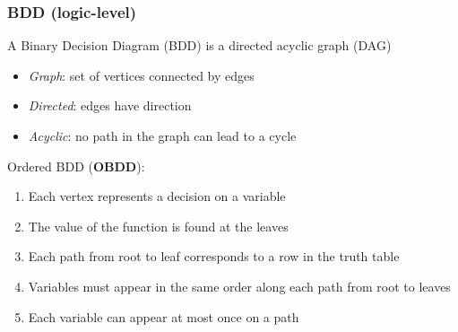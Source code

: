 \subsubsection{BDD (logic-level)}
A Binary Decision Diagram (BDD) is a directed acyclic graph (DAG)
\begin{itemize}
\item \textit{Graph}: set of vertices connected by edges
\item \textit{Directed}: edges have direction
\item \textit{Acyclic}: no path in the graph can lead to a cycle
\end{itemize}
Ordered BDD (\textbf{OBDD}):
\begin{enumerate}
\item Each vertex represents a decision on a variable
\item The value of the function is found at the leaves
\item Each path from root to leaf corresponds to a row in the truth table
\item Variables must appear in the same order along each path from root to leaves
\item Each variable can appear at most once on a path
\end{enumerate}

